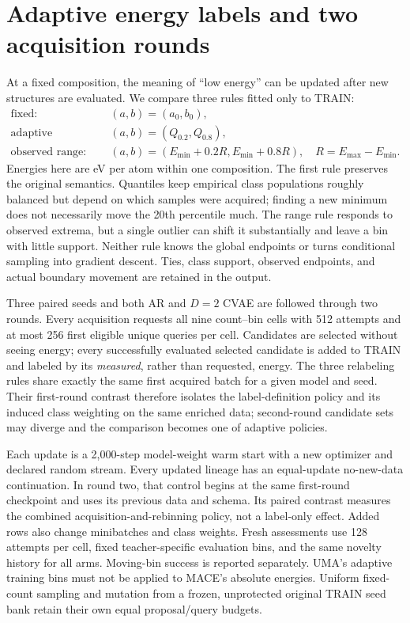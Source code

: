 \documentclass[11pt]{article}
\begin{document}


\section{Adaptive energy labels and two acquisition rounds}
At a fixed composition, the meaning of ``low energy'' can be updated after
new structures are evaluated. We compare three rules fitted only to TRAIN:
\begin{align}
\text{fixed:}\quad &(a,b)=(a_0,b_0),\\
\text{adaptive quantiles:}\quad &(a,b)=(Q_{0.2},Q_{0.8}),\\
\text{observed range:}\quad &(a,b)=(E_{\min}+0.2R,E_{\min}+0.8R),\quad
R=E_{\max}-E_{\min}.
\end{align}
Energies here are eV per atom within one composition. The first rule preserves
the original semantics. Quantiles keep empirical class populations roughly
balanced but depend on which samples were acquired; finding a new minimum
does not necessarily move the 20th percentile much. The range rule responds
to observed extrema, but a single outlier can shift it substantially and
leave a bin with little support. Neither rule knows the global endpoints or
turns conditional sampling into gradient descent. Ties, class support,
observed endpoints, and actual boundary movement are retained in the output.

Three paired seeds and both AR and $D=2$ CVAE are followed through two rounds.
Every acquisition requests all nine count--bin cells with 512 attempts and
at most 256 first eligible unique queries per cell. Candidates are selected
without seeing energy; every successfully evaluated selected candidate is
added to TRAIN and labeled by its \emph{measured}, rather than requested,
energy. The three relabeling rules share exactly the same first acquired
batch for a given model and seed. Their first-round contrast therefore
isolates the label-definition policy and its induced class weighting on the
same enriched data; second-round candidate sets
may diverge and the comparison becomes one of adaptive policies.

Each update is a 2,000-step model-weight warm start with a new optimizer and
declared random stream. Every updated lineage has an equal-update no-new-data
continuation. In round two, that control begins at the same first-round
checkpoint and uses its previous data and schema. Its paired contrast
measures the combined acquisition-and-rebinning policy, not a label-only
effect. Added rows also change minibatches and class weights. Fresh
assessments use 128 attempts per cell, fixed teacher-specific evaluation bins,
and the same novelty history for all arms. Moving-bin success is reported
separately. UMA's adaptive training bins must not be applied to MACE's
absolute energies. Uniform fixed-count sampling and mutation from a frozen,
unprotected original TRAIN seed bank retain their own equal proposal/query
budgets.
\end{document}
